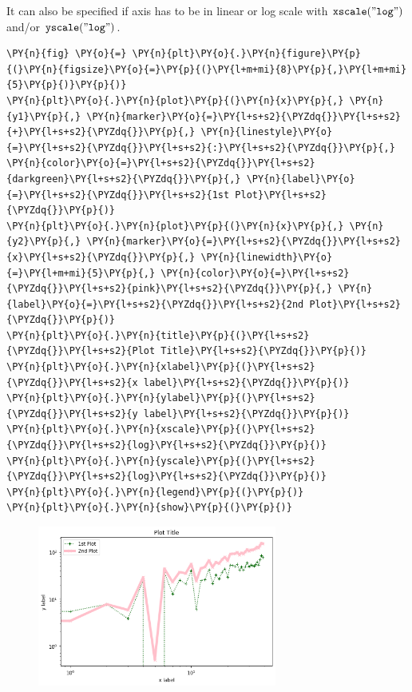 It can also be specified if axis has to be in linear or log scale with
\(\tt{xscale("log")}\) and/or \(\tt{yscale("log")}\).

\begin{tcolorbox}[breakable, size=fbox, boxrule=1pt, pad at break*=1mm,colback=cellbackground, colframe=cellborder]
\begin{Verbatim}[commandchars=\\\{\}]
\PY{n}{fig} \PY{o}{=} \PY{n}{plt}\PY{o}{.}\PY{n}{figure}\PY{p}{(}\PY{n}{figsize}\PY{o}{=}\PY{p}{(}\PY{l+m+mi}{8}\PY{p}{,}\PY{l+m+mi}{5}\PY{p}{)}\PY{p}{)}
\PY{n}{plt}\PY{o}{.}\PY{n}{plot}\PY{p}{(}\PY{n}{x}\PY{p}{,} \PY{n}{y1}\PY{p}{,} \PY{n}{marker}\PY{o}{=}\PY{l+s+s2}{\PYZdq{}}\PY{l+s+s2}{+}\PY{l+s+s2}{\PYZdq{}}\PY{p}{,} \PY{n}{linestyle}\PY{o}{=}\PY{l+s+s2}{\PYZdq{}}\PY{l+s+s2}{:}\PY{l+s+s2}{\PYZdq{}}\PY{p}{,} \PY{n}{color}\PY{o}{=}\PY{l+s+s2}{\PYZdq{}}\PY{l+s+s2}{darkgreen}\PY{l+s+s2}{\PYZdq{}}\PY{p}{,} \PY{n}{label}\PY{o}{=}\PY{l+s+s2}{\PYZdq{}}\PY{l+s+s2}{1st Plot}\PY{l+s+s2}{\PYZdq{}}\PY{p}{)}
\PY{n}{plt}\PY{o}{.}\PY{n}{plot}\PY{p}{(}\PY{n}{x}\PY{p}{,} \PY{n}{y2}\PY{p}{,} \PY{n}{marker}\PY{o}{=}\PY{l+s+s2}{\PYZdq{}}\PY{l+s+s2}{x}\PY{l+s+s2}{\PYZdq{}}\PY{p}{,} \PY{n}{linewidth}\PY{o}{=}\PY{l+m+mi}{5}\PY{p}{,} \PY{n}{color}\PY{o}{=}\PY{l+s+s2}{\PYZdq{}}\PY{l+s+s2}{pink}\PY{l+s+s2}{\PYZdq{}}\PY{p}{,} \PY{n}{label}\PY{o}{=}\PY{l+s+s2}{\PYZdq{}}\PY{l+s+s2}{2nd Plot}\PY{l+s+s2}{\PYZdq{}}\PY{p}{)}
\PY{n}{plt}\PY{o}{.}\PY{n}{title}\PY{p}{(}\PY{l+s+s2}{\PYZdq{}}\PY{l+s+s2}{Plot Title}\PY{l+s+s2}{\PYZdq{}}\PY{p}{)}
\PY{n}{plt}\PY{o}{.}\PY{n}{xlabel}\PY{p}{(}\PY{l+s+s2}{\PYZdq{}}\PY{l+s+s2}{x label}\PY{l+s+s2}{\PYZdq{}}\PY{p}{)}
\PY{n}{plt}\PY{o}{.}\PY{n}{ylabel}\PY{p}{(}\PY{l+s+s2}{\PYZdq{}}\PY{l+s+s2}{y label}\PY{l+s+s2}{\PYZdq{}}\PY{p}{)}
\PY{n}{plt}\PY{o}{.}\PY{n}{xscale}\PY{p}{(}\PY{l+s+s2}{\PYZdq{}}\PY{l+s+s2}{log}\PY{l+s+s2}{\PYZdq{}}\PY{p}{)}
\PY{n}{plt}\PY{o}{.}\PY{n}{yscale}\PY{p}{(}\PY{l+s+s2}{\PYZdq{}}\PY{l+s+s2}{log}\PY{l+s+s2}{\PYZdq{}}\PY{p}{)}
\PY{n}{plt}\PY{o}{.}\PY{n}{legend}\PY{p}{(}\PY{p}{)}
\PY{n}{plt}\PY{o}{.}\PY{n}{show}\PY{p}{(}\PY{p}{)}
\end{Verbatim}
\end{tcolorbox}

\begin{figure}[h]
	\centering
	\includegraphics[width=0.7\textwidth]{figures/matplotlib_21_0.png}
\end{figure}

